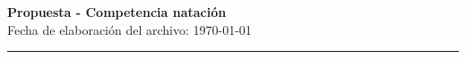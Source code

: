 \begin{center}
    \textbf{
        \huge
        Propuesta - Competencia natación}\vspace{1cm}
    \\
    \large
    Fecha de elaboración del archivo: \today
\end{center}
\hrule